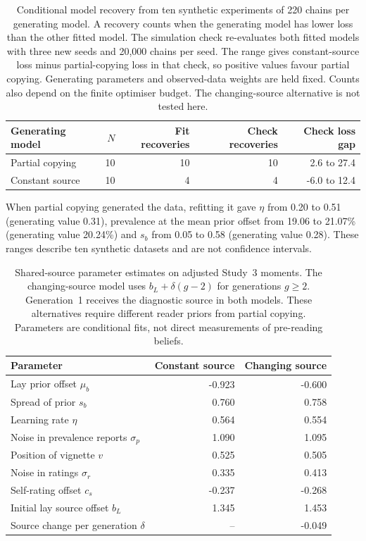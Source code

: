 \begin{table}[htbp]
\centering
\caption{Conditional model recovery from ten synthetic experiments of 220 chains per generating model. A recovery counts when the generating model has lower loss than the other fitted model. The simulation check re-evaluates both fitted models with three new seeds and 20,000 chains per seed. The range gives constant-source loss minus partial-copying loss in that check, so positive values favour partial copying. Generating parameters and observed-data weights are held fixed. Counts also depend on the finite optimiser budget. The changing-source alternative is not tested here.}
\label{tab:recovery}
\begin{tabular}{lrrrr}
\toprule
Generating model & $N$ & Fit recoveries & Check recoveries & Check loss gap \\
\midrule
Partial copying & 10 & 10 & 10 & 2.6 to 27.4 \\
Constant source & 10 & 4 & 4 & -6.0 to 12.4 \\
\bottomrule\end{tabular}
\par\smallskip\begin{minipage}{0.95\textwidth}\small
When partial copying generated the data, refitting it gave $\eta$ from 0.20 to 0.51 (generating value 0.31), prevalence at the mean prior offset from 19.06 to 21.07\% (generating value 20.24\%) and $s_b$ from 0.05 to 0.58 (generating value 0.28). These ranges describe ten synthetic datasets and are not confidence intervals.
\end{minipage}
\end{table}

\begin{table}[htbp]
\centering
\caption{Shared-source parameter estimates on adjusted Study~3 moments. The changing-source model uses $b_L+\delta(g-2)$ for generations $g\geq2$. Generation~1 receives the diagnostic source in both models. These alternatives require different reader priors from partial copying. Parameters are conditional fits, not direct measurements of pre-reading beliefs.}
\label{tab:alternative}
\begin{tabular}{lrr}
\toprule
Parameter & Constant source & Changing source \\
\midrule
Lay prior offset $\mu_b$ & -0.923 & -0.600 \\
Spread of prior $s_b$ & 0.760 & 0.758 \\
Learning rate $\eta$ & 0.564 & 0.554 \\
Noise in prevalence reports $\sigma_p$ & 1.090 & 1.095 \\
Position of vignette $v$ & 0.525 & 0.505 \\
Noise in ratings $\sigma_r$ & 0.335 & 0.413 \\
Self-rating offset $c_s$ & -0.237 & -0.268 \\
Initial lay source offset $b_L$ & 1.345 & 1.453 \\
Source change per generation $\delta$ & -- & -0.049 \\
\bottomrule\end{tabular}\end{table}


